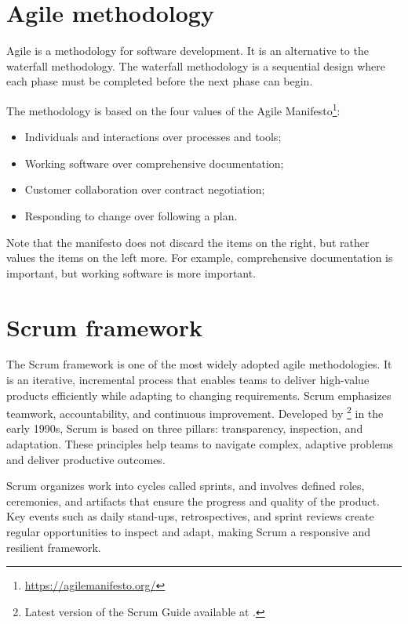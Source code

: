 \section{Agile methodology}

Agile is a methodology for software development.  It is an alternative to the waterfall
methodology.  The waterfall methodology is a sequential design where each phase
must be completed before the next phase can begin.

The methodology is based on the four values of the Agile Manifesto\footnote{\url{https://agilemanifesto.org/}}:
\begin{itemize}
  \itemsep0em
  \item Individuals and interactions over processes and tools;
  \item Working software over comprehensive documentation;
  \item Customer collaboration over contract negotiation;
  \item Responding to change over following a plan.
\end{itemize}

Note that the manifesto does not discard the items on the right, but rather values the items on
the left more.  For example, comprehensive documentation is important, but working software
is more important.

\section{Scrum framework}

The Scrum framework is one of the most widely adopted agile methodologies. It is an
iterative, incremental process that enables teams to deliver high-value products
efficiently while adapting to changing requirements. Scrum emphasizes teamwork,
accountability, and continuous improvement. Developed by \textcite{schwaber2020scrum}%
\footnote{Latest version of the Scrum Guide available at .}
in the early 1990s, Scrum is based on three pillars: transparency, inspection, and
adaptation. These principles help teams to navigate complex, adaptive problems and deliver
productive outcomes.

Scrum organizes work into cycles called sprints, and involves defined roles, ceremonies,
and artifacts that ensure the progress and quality of the product. Key events such as
daily stand-ups, retrospectives, and sprint reviews create regular opportunities to inspect
and adapt, making Scrum a responsive and resilient framework.


